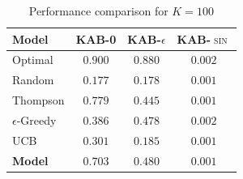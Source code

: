 \begin{table}[H]
\centering
\caption{Performance comparison for $K=100$}
\label{tab:k1000}
\begin{tabular}{l c c c}
\toprule
\textbf{Model} & \textbf{\textsc{KAB-0}} & \textbf{\textsc{KAB-$\epsilon$}} & \textbf{\textsc{KAB-$\sin$}} \\
\midrule
Optimal & $0.900$ & $0.880$ & $0.002$  \\
Random & $0.177$ & $0.178$ & $0.001$ \\
\midrule
Thompson & $0.779$ & $0.445$ & $0.001$ \\
$\epsilon$-Greedy & $0.386$ & $0.478$ & $0.002$ \\
UCB & $0.301$ & $0.185$ & $0.001$ \\
\textbf{Model} & $\mathbf{0.703}$ & $\mathbf{0.480}$ & $\mathbf{0.001}$  \\
\bottomrule
\end{tabular}
\end{table}


\newpage
